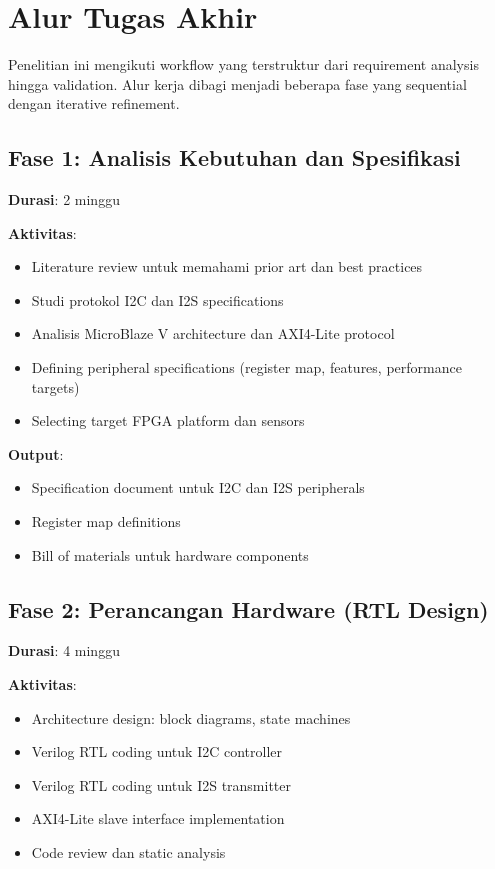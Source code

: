 \section{Alur Tugas Akhir}

Penelitian ini mengikuti workflow yang terstruktur dari requirement analysis hingga validation. Alur kerja dibagi menjadi beberapa fase yang sequential dengan iterative refinement.

\subsection{Fase 1: Analisis Kebutuhan dan Spesifikasi}

\textbf{Durasi}: 2 minggu

\textbf{Aktivitas}:
\begin{itemize}
	\item Literature review untuk memahami prior art dan best practices
	\item Studi protokol I2C dan I2S specifications
	\item Analisis MicroBlaze V architecture dan AXI4-Lite protocol
	\item Defining peripheral specifications (register map, features, performance targets)
	\item Selecting target FPGA platform dan sensors
\end{itemize}

\textbf{Output}:
\begin{itemize}
	\item Specification document untuk I2C dan I2S peripherals
	\item Register map definitions
	\item Bill of materials untuk hardware components
\end{itemize}

\subsection{Fase 2: Perancangan Hardware (RTL Design)}

\textbf{Durasi}: 4 minggu

\textbf{Aktivitas}:
\begin{itemize}
	\item Architecture design: block diagrams, state machines
	\item Verilog RTL coding untuk I2C controller
	\item Verilog RTL coding untuk I2S transmitter
	\item AXI4-Lite slave interface implementation
	\item Code review dan static analysis
\end{itemize}

